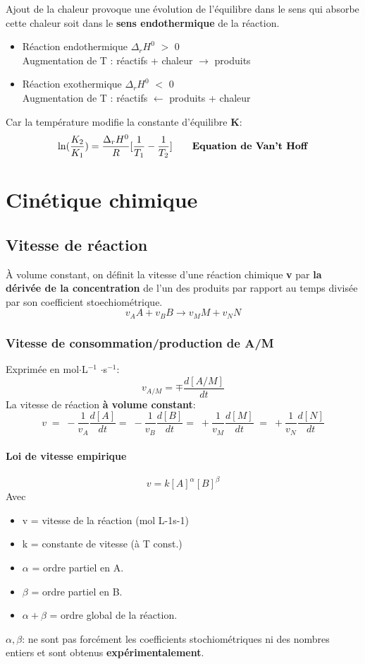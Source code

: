 \documentclass[10pt,a4paper]{book}
\begin{document}
Ajout de la chaleur provoque une évolution de l’équilibre dans le sens qui absorbe cette chaleur soit dans le \textbf{sens endothermique} de la réaction.
\begin{itemize}
\item Réaction endothermique $\Delta_rH^0$ $>$ 0 \\
Augmentation de T : réactifs + chaleur $\rightarrow$ produits
\item Réaction exothermique $\Delta_rH^0$ $<$ 0 \\
Augmentation de T : réactifs $\leftarrow$ produits + chaleur
\end{itemize} \par
Car la température modifie la constante d'équilibre \textbf{K}:
\[\ln(\frac{K_2}{K_1}) = \frac{\Delta_rH^0}{R}[\frac{1}{T_1}-\frac{1}{T_2}] \tag*{\textbf{Equation de Van’t Hoff}}\]

\chapter{Cinétique chimique}

\section{Vitesse de réaction}
À volume constant, on définit la vitesse d’une réaction chimique \textbf{v} par \textbf{la dérivée de la concentration} de l’un des produits par rapport au temps divisée par son coefficient stoechiométrique.
\[v_AA + v_BB \longrightarrow v_MM + v_NN\]

\subsection{Vitesse de consommation/production de A/M}

Exprimée en mol$\cdot$L$^{-1}$ $\cdot$s$^{-1}$:
\[v_{A/M} = \mp \frac{d[A/M]}{dt}\]
La vitesse de réaction \textbf{à volume constant}:
\[v \; = \; -\frac{1}{v_A}\frac{d[A]}{dt} =\; -\frac{1}{v_B}\frac{d[B]}{dt} = \; +\frac{1}{v_M}\frac{d[M]}{dt} \; = \; +\frac{1}{v_N}\frac{d[N]}{dt}\] 

\subsubsection{Loi de vitesse empirique}

\[v = k[A]^{\alpha}[B]^{\beta}\]
Avec
\begin{itemize}
\item v = vitesse de la réaction (mol L-1s-1)
\item k = constante de vitesse (à T const.)
\item $\alpha$ = ordre partiel en A.
\item $\beta$ = ordre partiel en B.
\item \(\alpha + \beta\) = ordre global de la réaction.
\end{itemize}
\(\alpha, \beta\): ne sont pas forcément les coefficients stochiométriques ni des nombres entiers et sont obtenus \textbf{expérimentalement}.
\end{document}
